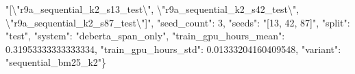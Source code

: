 "[\textbackslash{}"r9a\_sequential\_k2\_s13\_test\textbackslash{}", \textbackslash{}"r9a\_sequential\_k2\_s42\_test\textbackslash{}", \textbackslash{}"r9a\_sequential\_k2\_s87\_test\textbackslash{}"]", "seed\_count": 3, "seeds": "[13, 42, 87]", "split": "test", "system": "deberta\_span\_only", "train\_gpu\_hours\_mean": 0.31953333333333334, "train\_gpu\_hours\_std": 0.01333204160409548, "variant": "sequential\_bm25\_k2"\}
